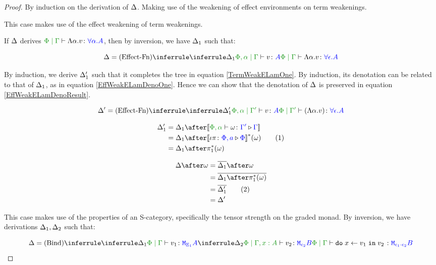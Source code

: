 \documentclass{Report}
\newcommand\numberthis{\addtocounter{equation}{1}\tag{\theequation}}
\begin{document}
\begin{proof}
    By induction on the derivation of $\Delta$. Making use of the weakening of effect environments on term weakenings.

This case makes use of the effect weakening of term weakenings.

If $\Delta$ derives $\gpetyperelation{\elam{\a}{v}}{\all{\a}{A}}$, then by inversion, we have $\Delta_1$ such that:

\begin{equation}
    \D = \ntreeruleI{Effect-Fn}{\treeruleI{\D_1}{\etyperelation{\P,\a}{\G}{v}{A}}}{\gpetyperelation{\elam{\a}{v}}{\all{\e}{A}}}
\end{equation}

By induction, we derive $\Delta_1'$ such that it completes the tree in equation \ref{TermWeakELamOne}. By induction, its denotation can be related to that of $\Delta_1$, as in equation \ref{EffWeakELamDenoOne}. Hence we can show that the denotation of $\Delta$ is preserved in equation \ref{EffWeakELamDenoResult}.

\begin{equation}\label{TermWeakELamOne}
    \D' = \ntreeruleI{Effect-Fn}{\treeruleI{\D_1'}{\etyperelation{\P,\a}{\G'}{v}{A}}}{\etyperelation{\P}{\G'}{(\elam{\a}{v})}{\all{\e}{A}}}
\end{equation}

\begin{align*}
    \D_1' & = \D_1\after\deno{\ewrel{\P,\a}{\w}{\G'}{\G}}\\
    & = \D_1\after\deno{\wrel{\i\pi}{\P,a}{\P}}\star(\w) \numberthis\label{EffWeakELamDenoOne}\\
    & = \D_1\after\pstar(\w)
\end{align*}

\begin{align*}
    \D\after\w & = \bar{\D_1}\after\w\\
    & = \bar{\D_1\after\pstar(\w)}\\
    & = \bar{\D_1'}\numberthis\label{EffWeakELamDenoResult}\\
    & = \D'
\end{align*}


This case makes use of the properties of an S-category, specifically the tensor strength on the graded monad. By inversion, we have derivations $\Delta_1, \Delta_2$ such that:


\begin{equation}
    \D = \ntreeruleII{Bind}{
        \treeruleI{\D_1}{\etyperelation{\P}{\G}{v_1}{\M{\E_1}{A}}}
    }{
        \treeruleI{\D_2}{\etyperelation{\P}{\G,x: A}{v_2}{\M{\e_2}{B}}}
    }{
        \etyperelation{\P}{\G}{\doin{x}{v_1}{v_2}}{\M{\e_1\dot\e_2}{B}}
    }
\end{equation}


\end{proof}
\end{document}
